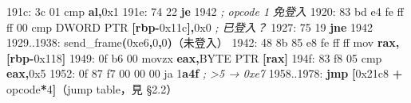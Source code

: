\documentclass[10pt,a4paper]{article}
\newenvironment{Shaded}{\begin{snugshade}}{\end{snugshade}}
\newcommand{\BaseNTok}[1]{\textcolor[rgb]{0.00,0.00,0.81}{#1}}
\newcommand{\BuiltInTok}[1]{#1}
\newcommand{\CommentTok}[1]{\textcolor[rgb]{0.56,0.35,0.01}{\textit{#1}}}
\newcommand{\ControlFlowTok}[1]{\textcolor[rgb]{0.13,0.29,0.53}{\textbf{#1}}}
\newcommand{\DataTypeTok}[1]{\textcolor[rgb]{0.13,0.29,0.53}{#1}}
\newcommand{\DecValTok}[1]{\textcolor[rgb]{0.00,0.00,0.81}{#1}}
\newcommand{\ErrorTok}[1]{\textcolor[rgb]{0.64,0.00,0.00}{\textbf{#1}}}
\newcommand{\FloatTok}[1]{\textcolor[rgb]{0.00,0.00,0.81}{#1}}
\newcommand{\KeywordTok}[1]{\textcolor[rgb]{0.13,0.29,0.53}{\textbf{#1}}}
\newcommand{\NormalTok}[1]{#1}
\newcommand{\OperatorTok}[1]{\textcolor[rgb]{0.81,0.36,0.00}{\textbf{#1}}}
\renewenvironment{Shaded}{%
  \def\FrameCommand{\fboxsep=3.2pt\colorbox{shadecolor}}%
  \MakeFramed{\advance\hsize-\width\FrameRestore\small}%
}{%
  \endMakeFramed
}
\begin{document}
\begin{Shaded}
\begin{Highlighting}[]
\NormalTok{191c: 3c 01                  }\BuiltInTok{cmp}    \KeywordTok{al}\OperatorTok{,}\BaseNTok{0x1}
\NormalTok{191e: 74 22                  }\ControlFlowTok{je}     \DecValTok{1942}                      \CommentTok{; opcode 1 免登入}
\NormalTok{1920: 83 bd e4 fe ff ff }\DecValTok{00}\NormalTok{   cmp    }\DataTypeTok{DWORD} \DataTypeTok{PTR} \OperatorTok{[}\KeywordTok{rbp}\OperatorTok{{-}}\BaseNTok{0x11c}\OperatorTok{],}\BaseNTok{0x0} \CommentTok{; 已登入？}
\NormalTok{1927: 75 19                  }\ControlFlowTok{jne}    \DecValTok{1942}
\NormalTok{1929..1938: send\_frame}\OperatorTok{(}\BaseNTok{0xe6}\OperatorTok{,}\DecValTok{0}\OperatorTok{,}\DecValTok{0}\OperatorTok{)}\NormalTok{（未登入）}
\NormalTok{1942: 48 8b 85 e8 fe ff ff   mov    }\KeywordTok{rax}\OperatorTok{,[}\KeywordTok{rbp}\OperatorTok{{-}}\BaseNTok{0x118}\OperatorTok{]}
\NormalTok{1949: 0f b6 }\DecValTok{00}\NormalTok{               movzx  }\KeywordTok{eax}\OperatorTok{,}\DataTypeTok{BYTE} \DataTypeTok{PTR} \OperatorTok{[}\KeywordTok{rax}\OperatorTok{]}
\NormalTok{194f: 83 f8 }\DecValTok{05}\NormalTok{               cmp    }\KeywordTok{eax}\OperatorTok{,}\BaseNTok{0x5}
\NormalTok{1952: 0f 87 f7 }\DecValTok{00} \DecValTok{00} \DecValTok{00}\NormalTok{      ja     }\DecValTok{1}\ErrorTok{a4f}                      \CommentTok{; \textgreater{}5 → 0xe7}
\NormalTok{1958..1978: }\ControlFlowTok{jmp} \OperatorTok{[}\BaseNTok{0x21c8} \OperatorTok{+}\NormalTok{ opcode}\OperatorTok{*}\DecValTok{4}\OperatorTok{]}\NormalTok{（jump table，見 §}\FloatTok{2.2}\NormalTok{）}


\end{Highlighting}
\end{Shaded}
\end{document}
